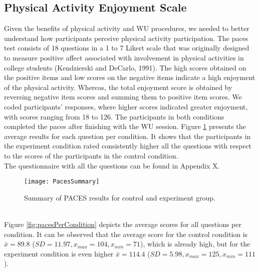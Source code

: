 \subsection{Physical Activity Enjoyment Scale}
Given the benefits of physical activity and WU procedures, we needed to better understand how participants 
perceive physical activity participation. The \acrfull{paces} test consists of 18 questions in a 1 to 7 Likert scale that was originally designed to measure positive affect associated with involvement in physical activities in college students (Kendzierski and DeCarlo, 1991).  The high scores obtained on the positive items and low scores on the negative items indicate a high enjoyment of the physical activity. Whereas, the total enjoyment score is obtained by reversing negative item scores and summing them to positive item scores. We coded participants' responses, where higher scores indicated greater enjoyment, with scores ranging from 18 to 126. The participants in both conditions completed the \gls{paces} after finishing with the WU session. Figure \ref{fig:pacees} presents the average results for each question per condition. It shows that the participants in the experiment condition rated consistently higher all the questions with respect to the scores of the participants in the control condition. \\The questionnaire with all the questions can be found in Appendix X.\\
\begin{figure}[h]
    \centering
    \texttt{[image: PacesSummary]}
    \caption{Summary of PACES results for control and experiment group.}
    \label{fig:pacees}
\end{figure}\\
Figure \ref{fig:pacesPerCondition} depicts the average scores for all questions per condition. It can be observed that the average score for the control condition is \begin{math}\bar{x} = 89.8 \end{math} (\begin{math} SD = 11.97, x_{max}= 104, x_{min}= 71\end{math}), which is already high, but for the experiment condition is even higher  \begin{math}\bar{x} = 114.4 \end{math} (\begin{math} SD = 5.98, x_{max}= 125, x_{min}= 111\end{math}).\\
